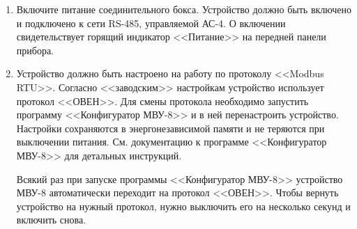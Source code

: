 \begin{enumerate}

\item Включите питание соединительного бокса. Устройство должно быть включено и подключено к сети RS-485, управляемой АС-4. О включении свидетельствует горящий индикатор <<Питание>> на передней панели прибора.

\item Устройство должно быть настроено на работу по протоколу <<Modbus RTU>>. Согласно <<заводским>> настройкам устройство использует протокол <<ОВЕН>>. Для смены протокола необходимо запустить программу <<Конфигуратор МВУ-8>> и в ней перенастроить устройство. Настройки сохраняются в энергонезависимой памяти и не теряются при выключении питания. См. документацию к программе <<Конфигуратор МВУ-8>> для детальных инструкций.

\IMPORTANT Всякий раз при запуске программы <<Конфигуратор МВУ-8>> устройство МВУ-8 автоматически переходит на протокол <<ОВЕН>>. Чтобы вернуть устройство на нужный протокол, нужно выключить его на несколько секунд и включить снова.

\end{enumerate}
